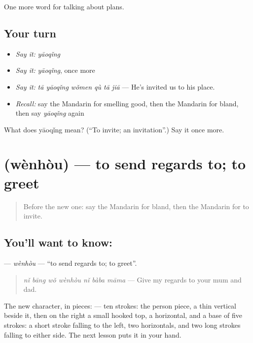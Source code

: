 \begin{grammarlens}[title={What you've built}]
One more word for talking about plans.
\end{grammarlens}

\subsection*{Your turn}
\begin{itemize}
\raggedright
  \item \emph{Say it:} \emph{yāoqǐng}
  \item \emph{Say it:} \emph{yāoqǐng}, once more
  \item \emph{Say it:} \emph{tā yāoqǐng wǒmen qù tā jiā} — He's invited us to his place.
  \item \emph{Recall:} say the Mandarin for smelling good, then the Mandarin for bland, then say \emph{yāoqǐng} again
\end{itemize}

\begin{tcolorbox}[breakable,colback=teal!4,colframe=teal!35!black,title={Before you move on}]
What does yāoqǐng mean? (\textquotedblleft{}To invite; an invitation\textquotedblright{}.) Say it once more.
\end{tcolorbox}
\section[\texorpdfstring{\zh{问候} (wènhòu)}{问候 (wènhòu)}]{ (wènhòu) — to send regards to; to greet}

\label{lesson:ZH-C173-wenhou}



\begin{quote}
Before the new one: say the Mandarin for bland, then the Mandarin for to invite.
\end{quote}

\subsection*{You'll want to know: }
\textbf{} — \emph{wènhòu} — \textquotedblleft{}to send regards to; to greet\textquotedblright{}.

\begin{quote}
\emph{nǐ bāng wǒ wènhòu nǐ bàba māma} — Give my regards to your mum and dad.
\end{quote}

The new character, in pieces:  — ten strokes: the person piece, a thin vertical beside it, then on the right a small hooked top, a horizontal, and a base of five strokes: a short stroke falling to the left, two horizontals, and two long strokes falling to either side. The next lesson puts it in your hand.

